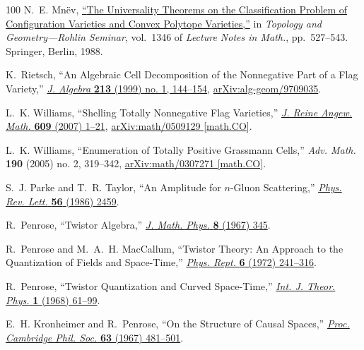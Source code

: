 \documentclass[12pt,hyperref,compress]{JHEP3}
\begin{document}
\begin{thebibliography}{100}
N.~E. Mn{\"e}v, \href{http://dx.doi.org/10.1007/BFb0082792}{``{The Universality
  Theorems on the Classification Problem of Configuration Varieties and Convex
  Polytope Varieties},''} in {\em Topology and Geometry---{R}ohlin {S}eminar},
  vol.~1346 of {\em Lecture Notes in Math.}, pp.~527--543.
\newblock Springer, Berlin, 1988.

K.~Rietsch, ``{An Algebraic Cell Decomposition of the Nonnegative Part of a
  Flag Variety},'' \href{http://dx.doi.org/10.1006/jabr.1998.7665}{{\em J.
  Algebra} {\bf 213} (1999) no. 1, 144--154},
  \href{http://arxiv.org/abs/alg-geom/9709035}{{ arXiv:alg-geom/9709035}}.

L.~K. Williams, ``{Shelling Totally Nonnegative Flag Varieties},''
  \href{http://dx.doi.org/10.1515/CRELLE.2007.059}{{\em J. Reine Angew. Math.}
  {\bf 609} (2007)  1--21}, \href{http://arxiv.org/abs/math/0509129}{{
  arXiv:math/0509129 [math.CO]}}.

L.~K. {Williams}, ``{Enumeration of Totally Positive Grassmann Cells},'' {\em
  {Adv. Math.}} {\bf 190} (2005) no. 2, 319--342,
  \href{http://arxiv.org/abs/arXiv:math/0307271}{{ arXiv:math/0307271
  [math.CO]}}.

S.~J. Parke and T.~R. Taylor, ``{An Amplitude for $n$-Gluon Scattering},''
\href{http://dx.doi.org/10.1103/PhysRevLett.56.2459}{{\em Phys. Rev. Lett.}
  {\bf 56} (1986)  2459}.

R.~Penrose, ``{Twistor Algebra},''
\href{http://dx.doi.org/10.1063/1.1705200}{{\em J. Math. Phys.} {\bf 8} (1967)
  345}.

R.~Penrose and M.~A.~H. MacCallum, ``{Twistor Theory: An Approach to the
  Quantization of Fields and Space-Time},''
\href{http://dx.doi.org/10.1016/0370-1573(73)90008-2}{{\em Phys. Rept.} {\bf 6}
  (1972)  241--316}.

R.~Penrose, ``{Twistor Quantization and Curved Space-Time},''
\href{http://dx.doi.org/10.1007/BF00668831}{{\em Int. J. Theor. Phys.} {\bf 1}
  (1968)  61--99}.

E.~H. Kronheimer and R.~Penrose, ``{On the Structure of Causal Spaces},''
\href{http://dx.doi.org/10.1017/S030500410004144X}{{\em Proc. Cambridge Phil.
  Soc.} {\bf 63} (1967)  481--501}.


\end{thebibliography}
\end{document}
